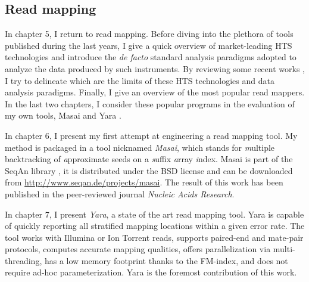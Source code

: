\subsection{Read mapping}

In chapter 5, I return to read mapping. Before diving into the plethora of tools published during the last years, I give a quick overview of market-leading HTS technologies and introduce the \emph{de facto} standard analysis paradigms adopted to analyze the data produced by such instruments.
By reviewing some recent works \citep{Derrien2012,Lee2012}, I try to delineate which are the limits of these HTS technologies and data analysis paradigms.
Finally, I give an overview of the most popular read mappers.
In the last two chapters, I consider these popular programs in the evaluation of my own tools, Masai \citep{Siragusa2013} and Yara \citep{Siragusa2014}.

In chapter 6, I present my first attempt at engineering a read mapping tool.
My method is packaged in a \CC tool nicknamed \emph{Masai}, which stands for \emph{m}ultiple backtracking of \emph{a}pproximate seeds on a \emph{s}uffix \emph{a}rray \emph{i}ndex.
Masai is part of the SeqAn library \citep{Doering2008}, it is distributed under the BSD license and can be downloaded from \url{http://www.seqan.de/projects/masai}.
The result of this work has been published \citep{Siragusa2013} in the peer-reviewed journal \emph{Nucleic Acids Research}.

In chapter 7, I present \emph{Yara}, a state of the art read mapping tool.
Yara is capable of quickly reporting all stratified mapping locations within a given error rate.
The tool works with Illumina or Ion Torrent reads, supports paired-end and mate-pair protocols, computes accurate mapping qualities, offers parallelization via multi-threading, has a low memory footprint thanks to the FM-index, and does not require ad-hoc parameterization.
Yara is the foremost contribution of this work.

